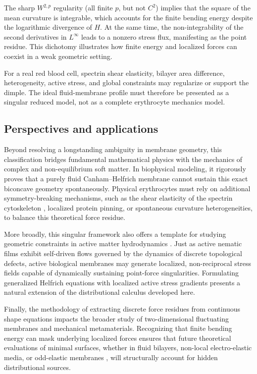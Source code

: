 \documentclass[preprint,amsmath,amssymb,aps,prl,superscriptaddress,nofootinbib,floatfix]{revtex4-2}
\begin{document}
The sharp \(W^{2,p}\) regularity (all finite \(p\), but not \(C^2\)) implies that the square of the mean curvature is integrable, which accounts for the finite bending energy despite the logarithmic divergence of \(H\). At the same time, the non-integrability of the second derivatives in \(L^\infty\) leads to a nonzero stress flux, manifesting as the point residue. This dichotomy illustrates how finite energy and localized forces can coexist in a weak geometric setting.

For a real red blood cell, spectrin shear elasticity, bilayer area difference, heterogeneity, active stress, and global constraints may regularize or support the dimple. The ideal fluid-membrane profile must therefore be presented as a singular reduced model, not as a complete erythrocyte mechanics model.

\subsection{Perspectives and applications}\label{sec:impacts}
Beyond resolving a longstanding ambiguity in membrane geometry, this classification bridges fundamental mathematical physics with the mechanics of complex and non-equilibrium soft matter. In biophysical modeling, it rigorously proves that a purely fluid Canham--Helfrich membrane cannot sustain this exact biconcave geometry spontaneously. Physical erythrocytes must rely on additional symmetry-breaking mechanisms, such as the shear elasticity of the spectrin cytoskeleton \cite{Discher1994,Lim2002,Mukhopadhyay2002}, localized protein pinning, or spontaneous curvature heterogeneities, to balance this theoretical force residue.

More broadly, this singular framework also offers a template for studying geometric constraints in active matter hydrodynamics \cite{Wu2015,Wu2016,Marchetti2013,SalbreuxJulicher2017,Farutin2019}. Just as active nematic films exhibit self-driven flows governed by the dynamics of discrete topological defects, active biological membranes may generate localized, non-reciprocal stress fields capable of dynamically sustaining point-force singularities. Formulating generalized Helfrich equations with localized active stress gradients presents a natural extension of the distributional calculus developed here.

Finally, the methodology of extracting discrete force residues from continuous shape equations impacts the broader study of two-dimensional fluctuating membranes and mechanical metamaterials. Recognizing that finite bending energy can mask underlying localized forces ensures that future theoretical evaluations of minimal surfaces, whether in fluid bilayers, non-local electro-elastic media, or odd-elastic membranes \cite{Scheibner2020}, will structurally account for hidden distributional sources.
\end{document}
